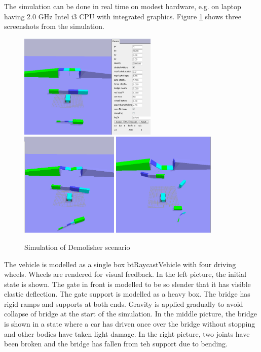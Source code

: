 The simulation can be done in real time on modest hardware, e.g. 
on laptop having 2.0 GHz Intel i3 CPU with integrated graphics. 
Figure \ref{fig:demolisher} shows three screenshots from the simulation.

\begin{figure}[htb!]
\centering
\includegraphics[height=5cm]{figs/demolisher-pre}
\includegraphics[height=5cm]{figs/demolisher-wip}
\includegraphics[height=5cm]{figs/demolisher-done}
\caption{Simulation of Demolisher scenario}
\label{fig:demolisher}
\end{figure}

The vehicle is modelled as a single box btRaycastVehicle with four driving wheels. Wheels are rendered for visual feedback.
In the left picture, the initial state is shown. 
The gate in front is modelled to be so slender that it has visible elastic deflection.
The gate support is modelled as a heavy box.
The bridge has rigid ramps and supports at both ends.
Gravity is applied gradually to avoid collapse of bridge at the start of the simulation.
In the middle picture, the bridge is shown in a state where a car has driven once over the bridge without stopping and
other bodies have taken light damage.
In the right picture, two joints have been broken and the bridge has fallen from teh support due to bending.

